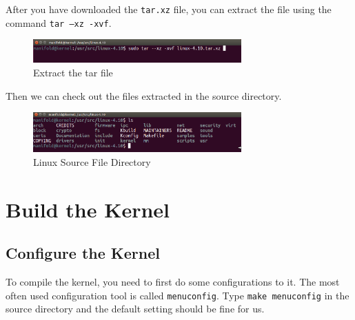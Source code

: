 \documentclass{article}
\begin{document}
After you have downloaded the \texttt{tar.xz} file, you can extract the file using the command \texttt{tar --xz -xvf}.
\begin{figure}
\centering
\includegraphics[width=8cm]{tar.png}
\caption{Extract the tar file}
\end{figure}
Then we can check out the files extracted in the source directory.
\begin{figure}[H]
\centering
\includegraphics[width=8cm]{dirs.png}
\caption{Linux Source File Directory}
\end{figure}

\section{Build the Kernel}
\subsection{Configure the Kernel}
To compile the kernel, you need to first do some configurations to it. The most often used configuration tool is called \texttt{menuconfig}. Type \texttt{make menuconfig} in the source directory and the default setting should be fine for us.
\end{document}
